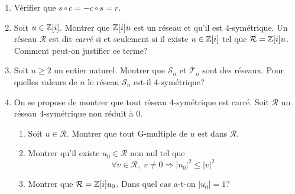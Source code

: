 \begin{enumerate}
\item Vérifier que $s\circ c = -c\circ s = r$.

\item Soit $u\in \mathbb{Z}[i]$. Montrer que $\mathbb{Z}[i]u$ est un réseau et qu'il est 4-symétrique.\newline
Un réseau $\mathcal{R}$ est dit \emph{carré} si et seulement si il existe $u\in \mathbb{Z}[i]$ tel que $\mathcal{R} = \mathbb{Z}[i]u$. Comment peut-on justifier ce terme?  
  
\item Soit $n\geq 2$ un entier naturel. Montrer que $\mathcal{S}_n$ et  $\mathcal{T}_n$ sont des réseaux. Pour quelles valeurs de $n$ le réseau $\mathcal{S}_n$ est-il 4-symétrique?

\item On se propose de montrer que tout réseau 4-symétrique est carré.\newline
Soit $\mathcal{R}$ un réseau 4-symétrique non réduit à $0$.
\begin{enumerate}
  \item Soit $u \in \mathcal{R}$. Montrer que  tout G-multiple de $u$ est dans $\mathcal{R}$.

  \item Montrer qu'il existe $u_0\in \mathcal{R}$ non nul tel que 
\begin{displaymath}
\forall v \in \mathcal{R}, \;v\neq 0 \Rightarrow  |u_0|^2 \leq |v|^2 
\end{displaymath}
  \item Montrer que $\mathcal{R} = \mathbb{Z}[i]u_0$. Dans quel cas a-t-on $|u_0|=1$?
\end{enumerate}
\end{enumerate}

